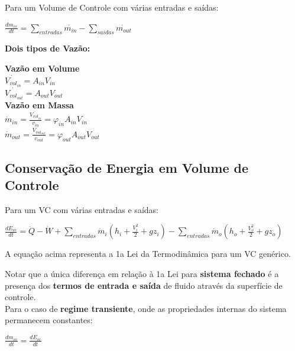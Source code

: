 \documentclass[a4paper, 12pt]{article}
\begin{document}
Para um Volume de Controle com várias entradas e saídas:
	\begin{center}
		\large
		$ \frac{dm_{vc}}{dt} = \sum\limits_{entradas}\dot{m_{in}} - \sum\limits_{saidas}\dot{m_{out}}$
	\end{center}

\textbf{Dois tipos de Vazão:}\\
	\begin{center}
		\large
		\textbf{Vazão em Volume}\\
		$ \dot{V_{vol_{in}}} = A_{in}V_{in} $\\
		$ \dot{V_{vol_{out}}} = A_{out}V_{out} $\\
		
		\textbf{Vazão em Massa}\\
		$ \dot{m}_{in} = \frac{\dot{V_{vol_{in}}}}{v_{in}} = \varphi_{in}A_{in}V_{in} $\\
		$ \dot{m}_{out} = \frac{\dot{V_{vol_{out}}}}{v_{out}} = \varphi_{out}A_{out}V_{out} $
	\end{center}

\subsection{Conservação de Energia em Volume de Controle}
Para um VC com várias entradas e saídas:
	\begin{center}
		\large
		$ \frac{dE_{vc}}{dt} = \dot{Q} - \dot{W} + \sum\limits_{entradas}\dot{m}_i(h_i + \frac{V_i^2}{2} + gz_i) - \sum\limits_{entradas}\dot{m}_o(h_o + \frac{V_o^2}{2} + gz_o) $
	\end{center}
A equação acima representa a 1a Lei da Termodinâmica para um VC genérico.

Notar que a única diferença em relação à 1a Lei para \textbf{sistema fechado} é a
presença dos \textbf{termos de entrada e saída} de fluido através da superfície de
controle.\\

Para o caso de \textbf{regime transiente}, onde as propriedades internas do sistema permanecem constantes:
	\begin{center}
		\large
		$ \frac{dm_{vc}}{dt} = \frac{dE_{vc}}{dt}$
	\end{center}
\end{document}
